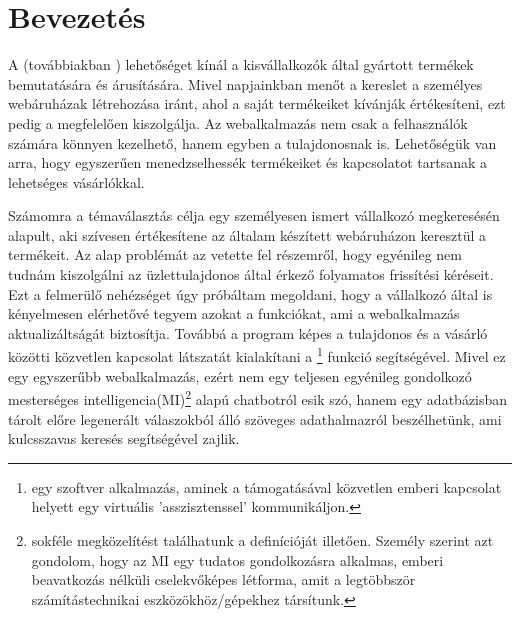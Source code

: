 \chapter{Bevezetés} %
\label{ch:intro}

A \citeauthor{WebBeauty}(továbbiakban \citeauthor{WB}) lehetőséget kínál a kisvállalkozók által gyártott termékek bemutatására és árusítására. Mivel napjainkban menőt a kereslet a személyes webáruházak létrehozása iránt, ahol a saját termékeiket kívánják értékesíteni, ezt pedig a \citeauthor{WB} megfelelően kiszolgálja. Az webalkalmazás nem csak a felhasználók számára könnyen kezelhető, hanem egyben a tulajdonosnak is. Lehetőségük van arra, hogy egyszerűen menedzselhessék termékeiket és kapcsolatot tartsanak a lehetséges vásárlókkal. 

Számomra a témaválasztás célja egy személyesen ismert vállalkozó megkeresésén alapult, aki szívesen értékesítene az általam készített webáruházon keresztül a termékeit. Az alap problémát az vetette fel részemről, hogy egyénileg nem tudnám kiszolgálni az üzlettulajdonos által érkező folyamatos frissítési kéréseit. Ezt a felmerülő nehézséget úgy próbáltam megoldani, hogy a vállalkozó által is kényelmesen elérhetővé tegyem azokat a funkciókat, ami a webalkalmazás aktualizáltságát biztosítja. Továbbá a program képes a tulajdonos és a vásárló közötti közvetlen kapcsolat látszatát kialakítani a \citeauthor{chatbot}\footnote{egy szoftver alkalmazás, aminek a támogatásával közvetlen emberi kapcsolat helyett egy virtuális ’asszisztenssel’ kommunikáljon.} funkció segítségével. Mivel ez egy egyszerűbb webalkalmazás, ezért nem egy teljesen egyénileg gondolkozó mesterséges intelligencia(MI)\footnote{sokféle megközelítést találhatunk a definícióját illetően. Személy szerint azt gondolom, hogy az MI egy tudatos gondolkozásra alkalmas, emberi beavatkozás nélküli cselekvőképes létforma, amit a legtöbbször számítástechnikai eszközökhöz/gépekhez társítunk.} alapú chatbotról esik szó, hanem egy adatbázisban tárolt előre legenerált válaszokból álló szöveges adathalmazról beszélhetünk, ami kulcsszavas keresés segítségével zajlik.

